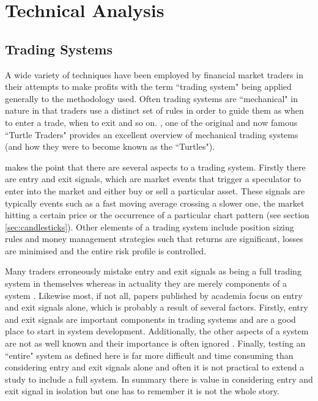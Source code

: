 \section{Technical Analysis}

\subsection{Trading Systems}
\label{sec:tradingsystems}
A wide variety of techniques have been employed by financial market traders in their attempts to make profits with the term \textquotedblleft trading system" being applied generally to the methodology used. Often trading systems are \textquotedblleft mechanical" in nature in that traders use a distinct set of rules in order to guide them as when to enter a trade, when to exit and so on. \cite{faith2007way}, one of the original and now famous \textquotedblleft Turtle Traders" provides an excellent overview of mechanical trading systems (and how they were to become known as the \textquotedblleft Turtles"). 

\cite{weissman2005mechanical} makes the point that there are several aspects to a trading system. Firstly there are entry and exit signals, which are market events that trigger a speculator to enter into the market and either buy or sell a particular asset. These signals are typically events such as a fast moving average crossing a slower one, the market hitting a certain price or the occurrence of a particular chart pattern (see section \ref{sec:candlesticks}). Other elements of a trading system include position sizing rules and money management strategies such that returns are significant, losses are minimised and the entire risk profile is controlled.

Many traders erroneously mistake entry and exit signals as being a full trading system in themselves whereas in actuality they are merely components of a system \citep{beau1999day}. Likewise most, if not all, papers published by academia focus on entry and exit signals alone, which is probably a result of several factors. Firstly, entry and exit signals are important components in  trading systems and are a good place to start in system development. Additionally, the other aspects of a system are not as well known and their importance is often ignored \citep{kaufman2013trading}. Finally, testing an \textquotedblleft entire" system as defined here is far more difficult and time consuming than considering entry and exit signals alone and often it is not practical to extend a study to include a full system. In summary there is value in considering entry and exit signal in isolation but one has to remember it is not the whole story.

